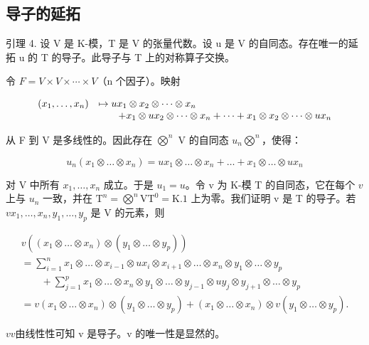 \subsection{导子的延拓}

引理 4. 设 V 是 K-模，T 是 V 的张量代数。设 u 是 V 的自同态。存在唯一的延拓 u 的 T 的导子。此导子与 T 上的对称算子交换。

令 \(F = V \times V \times \cdots \times V\)（n 个因子）。映射

\[
\begin{array}{r l} (x _ {1}, \ldots , x _ {n}) & \mapsto u x _ {1} \otimes x _ {2} \otimes \dots \otimes x _ {n} \\ & \qquad + x _ {1} \otimes u x _ {2} \otimes \dots \otimes x _ {n} + \dots + x _ {1} \otimes x _ {2} \otimes \dots \otimes u x _ {n} \end{array}
\]

从 F 到  V 是多线性的。因此存在 \(\bigotimes^{n}\) V 的自同态 \(u_{n}\)\(\bigotimes^{n}\)，使得：

\[
u _ {n} \left(x _ {1} \otimes \dots \otimes x _ {n}\right) = u x _ {1} \otimes \dots \otimes x _ {n} + \dots + x _ {1} \otimes \dots \otimes u x _ {n}
\]

对 V 中所有 \(x_1, \ldots, x_n\) 成立。于是 \(u_1 = u\)。令 v 为 K-模 T 的自同态，它在每个 \(v\) 上与 \(u_n\) 一致，并在 \(\mathrm{T}^n = \bigotimes^n \mathrm{V}\)\(\mathrm{T}^0 = \mathrm{K}. 1\) 上为零。我们证明 v 是 T 的导子。若 \(v\)\(x_1, \ldots, x_n, y_1, \ldots, y_p\) 是 V 的元素，则

\[
\begin{array}{l} v ((x _ {1} \otimes \dots \otimes x _ {n}) \otimes (y _ {1} \otimes \dots \otimes y _ {p})) \\ = \sum_ {i = 1} ^ {n} x _ {1} \otimes \dots \otimes x _ {i - 1} \otimes u x _ {i} \otimes x _ {i + 1} \otimes \dots \otimes x _ {n} \otimes y _ {1} \otimes \dots \otimes y _ {p} \\ \qquad + \sum_ {j = 1} ^ {p} x _ {1} \otimes \dots \otimes x _ {n} \otimes y _ {1} \otimes \dots \otimes y _ {j - 1} \otimes u y _ {j} \otimes y _ {j + 1} \otimes \dots \otimes y _ {p} \\ = v (x _ {1} \otimes \dots \otimes x _ {n}) \otimes (y _ {1} \otimes \dots \otimes y _ {p}) + (x _ {1} \otimes \dots \otimes x _ {n}) \otimes v (y _ {1} \otimes \dots \otimes y _ {p}). \end{array}
\]

\(v\)\(v\)由线性性可知 v 是导子。v 的唯一性是显然的。

